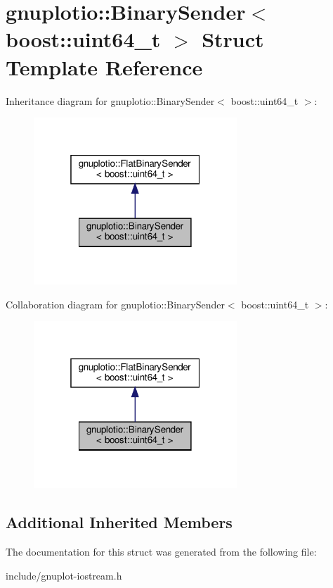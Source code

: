 \hypertarget{structgnuplotio_1_1BinarySender_3_01boost_1_1uint64__t_01_4}{}\section{gnuplotio\+:\+:Binary\+Sender$<$ boost\+:\+:uint64\+\_\+t $>$ Struct Template Reference}
\label{structgnuplotio_1_1BinarySender_3_01boost_1_1uint64__t_01_4}


Inheritance diagram for gnuplotio\+:\+:Binary\+Sender$<$ boost\+:\+:uint64\+\_\+t $>$\+:\nopagebreak
\begin{figure}[H]
\begin{center}
\leavevmode
\includegraphics[width=217pt]{structgnuplotio_1_1BinarySender_3_01boost_1_1uint64__t_01_4__inherit__graph}
\end{center}
\end{figure}


Collaboration diagram for gnuplotio\+:\+:Binary\+Sender$<$ boost\+:\+:uint64\+\_\+t $>$\+:\nopagebreak
\begin{figure}[H]
\begin{center}
\leavevmode
\includegraphics[width=217pt]{structgnuplotio_1_1BinarySender_3_01boost_1_1uint64__t_01_4__coll__graph}
\end{center}
\end{figure}
\subsection*{Additional Inherited Members}


The documentation for this struct was generated from the following file\+:\begin{DoxyCompactItemize}
\item 
include/gnuplot-\/iostream.\+h\end{DoxyCompactItemize}
